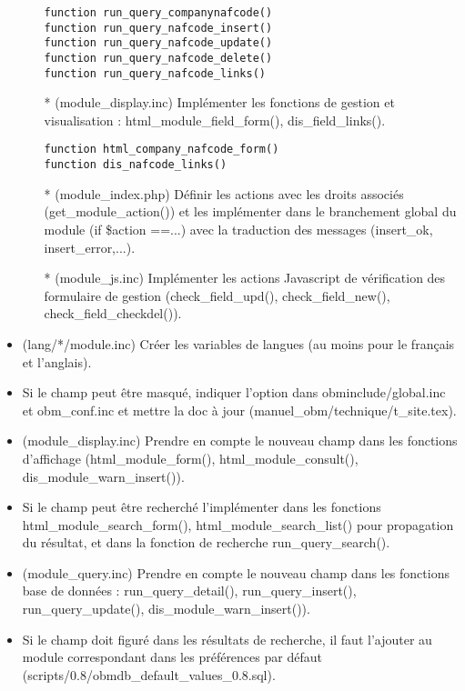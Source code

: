 \begin{itemize}
\begin{itemize}
      \begin{verbatim}
function run_query_companynafcode()
function run_query_nafcode_insert()
function run_query_nafcode_update()
function run_query_nafcode_delete()
function run_query_nafcode_links()
      \end{verbatim}
     \item[*] (module\_display.inc) Implémenter les fonctions de gestion et visualisation : html\_module\_field\_form(), dis\_field\_links().
      \begin{verbatim}
function html_company_nafcode_form()
function dis_nafcode_links()
      \end{verbatim}
     \item[*] (module\_index.php) Définir les actions avec les droits associés (get\_module\_action()) et les implémenter dans le branchement global du module (if \$action ==...) avec la traduction des messages (insert\_ok, insert\_error,...).\\
     \item[*] (module\_js.inc) Implémenter les actions Javascript de vérification des formulaire de gestion (check\_field\_upd(), check\_field\_new(), check\_field\_checkdel()).\\
    \end{itemize}
 \item (lang/*/module.inc) Créer les variables de langues (au moins pour le français et l'anglais).\\
 \item Si le champ peut être masqué, indiquer l'option dans obminclude/global.inc et obm\_conf.inc et mettre la doc à jour (manuel\_obm/technique/t\_site.tex).\\
 \item (module\_display.inc) Prendre en compte le nouveau champ dans les fonctions d'affichage (html\_module\_form(), html\_module\_consult(), dis\_module\_warn\_insert()).\\
 \item Si le champ peut être recherché l'implémenter dans les fonctions html\_module\_search\_form(), html\_module\_search\_list() pour propagation du résultat, et dans la fonction de recherche run\_query\_search().\\
 \item (module\_query.inc) Prendre en compte le nouveau champ dans les fonctions base de données : run\_query\_detail(), run\_query\_insert(), run\_query\_update(), dis\_module\_warn\_insert()).\\
 \item Si le champ doit figuré dans les résultats de recherche, il faut l'ajouter au module correspondant dans les préférences par défaut (scripts/0.8/obmdb\_default\_values\_0.8.sql).
\end{itemize}
